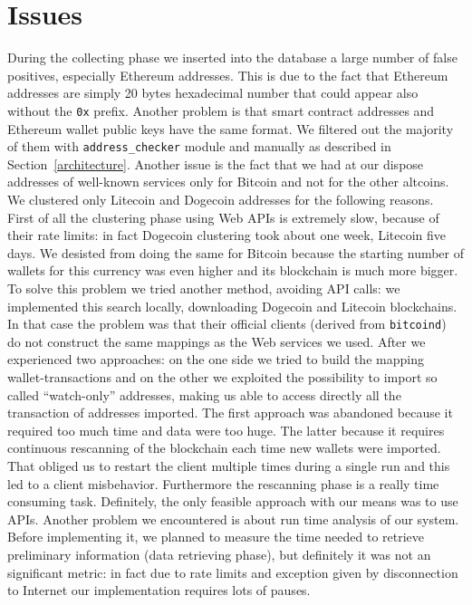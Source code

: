 \section{Issues} \label{sec:issues}
During the collecting phase we inserted into the database a large number of
false positives, especially Ethereum addresses. This is due to the fact that
Ethereum addresses are simply 20 bytes hexadecimal number that could appear
also without the \texttt{0x} prefix. Another problem is that smart contract
addresses and Ethereum wallet public keys have the same format. We filtered out
the majority of them with \texttt{address\_checker} module and manually as
described in Section~\ref{architecture}.
Another issue is the fact that we had at our dispose addresses
of well-known services only for Bitcoin and not for the other altcoins.
We clustered only Litecoin and Dogecoin addresses for the following reasons.
First of all the clustering phase using Web APIs is extremely slow, because of
their rate limits: in fact Dogecoin clustering took about one week, Litecoin
five days.
We desisted from doing the same for Bitcoin because the starting number of
wallets for this currency was even higher and its blockchain is much more
bigger. To solve this problem we tried another method, avoiding API calls: we
implemented this search locally, downloading Dogecoin and Litecoin blockchains.
In that case the problem was that their official clients (derived from
\texttt{bitcoind}) do not construct the same mappings as the Web services we
used. After we experienced two approaches: on the one side we tried to build the
mapping wallet-transactions and on the other we exploited the possibility to
import so called ``watch-only'' addresses, making us able to access directly
all the transaction of addresses imported.
The first approach was abandoned because it required too much time and data
were too huge. The latter because it requires continuous rescanning of the
blockchain each time new wallets were imported. That obliged us to restart the
client multiple times during a single run and this led to a client misbehavior.
Furthermore the rescanning phase is a really time consuming task.
Definitely, the only feasible approach with our means was to use APIs.
Another problem we encountered is about run time analysis of our
system. Before implementing it, we planned to measure the time needed to
retrieve preliminary information (data retrieving phase), but definitely it was
not an significant metric: in fact due to rate limits and exception given by
disconnection to Internet our implementation requires lots of pauses.
